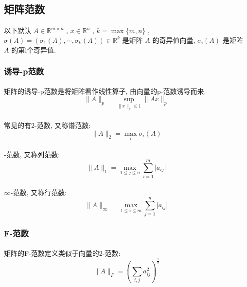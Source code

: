 \documentclass[a4paper, UTF8]{ctexart}				%
\numberwithin{equation}{section}				%
\begin{document}
		\subsection{矩阵范数}
			\paragraph{}
				\quad 以下默认 $A \in \mathbb{R}^{m \times n}$ , $x \in \mathbb{R}^{n}$ , $k = \max \{m, n\}$ , $\sigma(A) = (\sigma_1(A), \cdots, \sigma_k(A)) \in \mathbb{R}^{k}$ 是矩阵 $A$ 的奇异值向量, $\sigma_i(A)$ 是矩阵 $A$ 的第i个奇异值.
			\subsubsection{诱导-p范数}
				\paragraph{}
					\quad 矩阵的诱导-p范数是将矩阵看作线性算子, 由向量的p-范数诱导而来.
					\[
						\lVert{A}\rVert_p = \sup_{\lVert{x}\rVert_p \leq 1}\lVert{Ax}\rVert_p
					\]

				\paragraph{}
					\quad 常见的有2-范数, 又称谱范数:
					\[
						\lVert{A}\rVert_2 = \max_i \sigma_i(A)
					\]

				\paragraph{}
					-范数, 又称列范数:
					\[
						\lVert{A}\rVert_1 = \max_{1 \leq j \leq n}\sum_{i = 1}^m \lvert{a_{ij}}\rvert
					\]

				\paragraph{}
					\quad $\infty$-范数, 又称行范数:
					\[
						\lVert{A}\rVert_\infty = \max_{1 \leq i \leq m}\sum_{j = 1}^n \lvert{a_{ij}}\rvert
					\]

			\subsubsection{F-范数}
				\paragraph{}
					\quad 矩阵的F-范数定义类似于向量的2-范数:
					\[
						\lVert{A}\rVert_F = (\sum_{i, j} a_{ij}^2)^{\frac{1}{2}}
					\]
\end{document}
